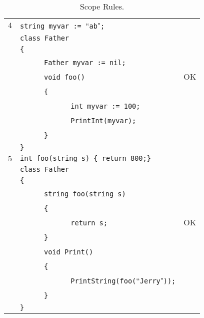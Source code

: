 \documentclass{article}
\begin{document}
\begin{table}[h]
\begin{tabular}{|l|l|l|}
\hline
 $4$ & \verb"string myvar := "``\verb"ab""\verb";" &    \\
     & \verb"class Father"                         &    \\
     & \verb"{"                                    &    \\
     & ~ ~ ~ ~\verb"Father myvar := nil;"          &    \\
     & ~ ~ ~ ~\verb"void foo()"                    & OK \\
     & ~ ~ ~ ~\verb"{"                             &    \\
     & ~ ~ ~ ~ ~ ~ ~ ~\verb"int myvar := 100;"     &    \\
     & ~ ~ ~ ~ ~ ~ ~ ~\verb"PrintInt(myvar);"      &    \\
     & ~ ~ ~ ~\verb"}"                             &    \\
     & \verb"}"                                    &    \\
\hline
 $5$ & \verb"int foo(string s) { return 800;}"    &    \\
     & \verb"class Father"                        &    \\
     & \verb"{"                                   &    \\
     & ~ ~ ~ ~\verb"string foo(string s)"         &    \\
     & ~ ~ ~ ~\verb"{"                            &    \\
     & ~ ~ ~ ~ ~ ~ ~ ~\verb"return s;"            & OK \\
     & ~ ~ ~ ~\verb"}"                            &    \\
     & ~ ~ ~ ~\verb"void Print()"                 &    \\
     & ~ ~ ~ ~\verb"{"                            &    \\
     & ~ ~ ~ ~ ~ ~ ~ ~\verb"PrintString(foo("``\verb"Jerry""\verb"));"  & \\
     & ~ ~ ~ ~\verb"}"                            &    \\
     & \verb"}"                                   &    \\
\hline
\end{tabular}
\caption{Scope Rules.
\label{Table_Code_Examples_Scope_Rules}}
\end{table}
\end{document}
